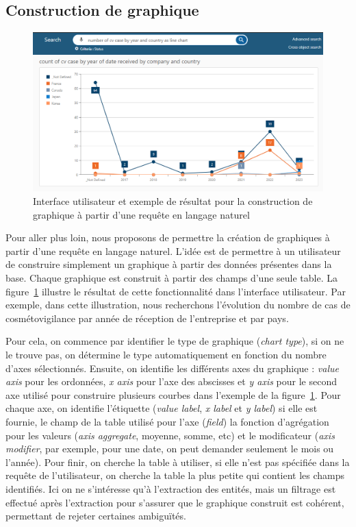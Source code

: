 \FloatBarrier
\subsection{Construction de graphique}

\begin{figure}[htb]
    \centering
    \includegraphics[width=\textwidth]{these/part_2/chapter_2/imgs/ui-dashboard-compress.png}
    \caption[Interface utilisateur pour la construction de graphique]{Interface utilisateur et exemple de résultat pour la construction de graphique à partir d'une requête en langage naturel}
    \label{fig:nl-query:dashboard-ui}
\end{figure}

Pour aller plus loin, nous proposons de permettre la création de graphiques à partir d'une requête en langage naturel.
L'idée est de permettre à un utilisateur de construire simplement un graphique à partir des données présentes dans la base.
Chaque graphique est construit à partir des champs d'une seule table.
La figure~\ref{fig:nl-query:dashboard-ui} illustre le résultat de cette fonctionnalité dans l'interface utilisateur.
Par exemple, dans cette illustration, nous recherchons l'évolution du nombre de cas de cosmétovigilance par année de réception de l'entreprise et par pays.

Pour cela, on commence par identifier le type de graphique (\emph{chart type}), si on ne le trouve pas, on détermine le type automatiquement en fonction du nombre d'axes sélectionnés.
Ensuite, on identifie les différents axes du graphique : \emph{value axis} pour les ordonnées, \emph{x axis} pour l'axe des abscisses et \emph{y axis} pour le second axe utilisé pour construire plusieurs courbes dans l'exemple de la figure~\ref{fig:nl-query:dashboard-ui}.
Pour chaque axe, on identifie l'étiquette (\emph{value label}, \emph{x label} et \emph{y label}) si elle est fournie, le champ de la table utilisé pour l'axe (\emph{field}) la fonction d'agrégation pour les valeurs (\emph{axis aggregate}, moyenne, somme, etc) et le modificateur (\emph{axis modifier}, par exemple, pour une date, on peut demander seulement le mois ou l'année).
Pour finir, on cherche la table à utiliser, si elle n'est pas spécifiée dans la requête de l'utilisateur, on cherche la table la plus petite qui contient les champs identifiés.
Ici on ne s'intéresse qu'à l'extraction des entités, mais un filtrage est effectué après l'extraction pour s'assurer que le graphique construit est cohérent, permettant de rejeter certaines ambiguïtés.

